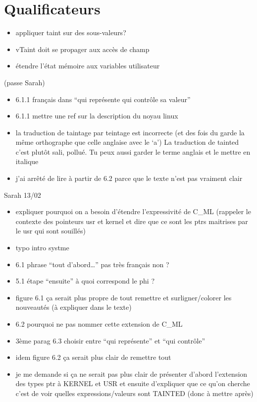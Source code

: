 \section{Qualificateurs}%

\begin{itemize}
\item appliquer taint sur des sous-valeurs?
\item vTaint doit se propager aux accès de champ
\item étendre l'état mémoire aux variables utilisateur
\end{itemize}

(passe Sarah)

\begin{itemize}
\item
  6.1.1 français dans ``qui représente qui contrôle sa valeur''
\item
  6.1.1 mettre une ref sur la description du noyau linux
\item
  la traduction de taintage par teintage est incorrecte (et des fois du
  garde la même orthographe que celle anglaise avec le `a') La
  traduction de tainted c'est plutôt sali, pollué. Tu peux aussi garder
  le terme anglais et le mettre en italique
\item
  j'ai arrêté de lire à partir de 6.2 parce que le texte n'est pas
  vraiment clair
\end{itemize}

Sarah 13/02

\begin{itemize}
\item
  expliquer pourquoi on a besoin d'étendre l'expressivité de C\_ML
  (rappeler le contexte des pointeurs usr et kernel et dire que ce sont
  les ptrs maitrises par le usr qui sont souillés)
\item
  typo intro systme
\item
  6.1 phrase ``tout d'abord\ldots{}'' pas très français non ?
\item
  5.1 étape ``ensuite'' à quoi correspond le phi ?
\item
  figure 6.1 ça serait plus propre de tout remettre et surligner/colorer
  les nouveautés (à expliquer dans le texte)
\item
  6.2 pourquoi ne pas nommer cette extension de C\_ML
\item
  3ème parag 6.3 choisir entre ``qui représente'' et ``qui contrôle''
\item
  idem figure 6.2 ça serait plus clair de remettre tout
\item
  je me demande si ça ne serait pas plus clair de présenter d'abord
  l'extension des types ptr à KERNEL et USR et ensuite d'expliquer que
  ce qu'on cherche c'est de voir quelles expressions/valeurs sont
  TAINTED (donc à mettre après)
\end{itemize}


